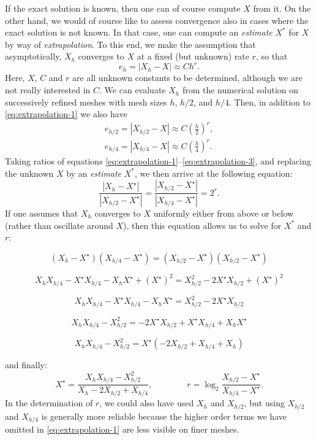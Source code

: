 If the exact solution is known, then one can of course compute $X$ from it.
On the other hand, we would of course like to assess convergence also in
cases where the exact solution is not known. In that case, one can compute
an \textit{estimate} $X^\ast$ for $X$ by way of \textit{extrapolation}.
To this end, we make the assumption that asymptotically, $X_h$ converges to
$X$ at a fixed (but unknown) rate $r$, so that
\begin{equation}
  \label{eq:extrapolation-1}
  e_h=|X_h-X| \approx C h^r.
\end{equation}
Here, $X$, $C$ and $r$ are all unknown constants to be determined, although
we are not really interested in $C$.
We can evaluate $X_h$ from the numerical solution
on successively refined meshes with mesh sizes $h$, $h/2$, and $h/4$. Then,
in addition to \eqref{eq:extrapolation-1} we also have
\begin{eqnarray}
  \label{eq:extrapolation-2}
  e_{h/2}=|X_{h/2}-X| \approx C \left(\frac h2\right)^r,
  \\
  \label{eq:extrapolation-3}
  e_{h/4} =|X_{h/4}-X| \approx C \left(\frac h4\right)^r.
\end{eqnarray}
Taking ratios of equations \eqref{eq:extrapolation-1}--\eqref{eq:extrapolation-3},
and replacing the unknown $X$ by an \textit{estimate} $X^\ast$, we then
arrive at the following equation:
\begin{equation*}
\frac{|X_h-X^\star|}{|X_{h/2}-X^\star|}
=
\frac{|X_{h/2}-X^\star|}{|X_{h/4}-X^\star|}=2^r.
\end{equation*}
If one assumes that $X_h$ converges to $X$ uniformly either from above or
below (rather than oscillate around $X$), then this equation allows us
to solve for $X^\ast$ and $r$:

\[
(X_h-X^\star)(X_{h/4}-X^\star)=(X_{h/2}-X^\star)(X_{h/2}-X^\star)
\]

\[
X_h X_{h/4}
-X^\star  X_{h/4}
- X_h X^\star 
+ (X^\star)^2
=X_{h/2}^2 -2 X^\star X_{h/2} + (X^\star)^2 
\]

\[
X_h X_{h/4}
-X^\star  X_{h/4}
- X_h X^\star 
=X_{h/2}^2 -2 X^\star X_{h/2} 
\]

\[
X_h X_{h/4}
-X_{h/2}^2 
=
-2 X^\star X_{h/2} 
+X^\star  X_{h/4}
+ X_h X^\star 
\]

\[
X_h X_{h/4}
-X_{h/2}^2 
=
X^\star ( -2  X_{h/2}  +   X_{h/4} + X_h )
\]

and finally:
\begin{equation*}
X^\star = \frac{X_h X_{h/4}-X_{h/2}^2}{X_h - 2 X_{h/2} + X_{h/4}}, \qquad\qquad
r = \log_2 \frac{X_{h/2}-X^\star}{X_{h/4}-X^\star}.
\end{equation*}
In the determination of $r$, we could also have used $X_h$ and $X_{h/2}$,
but using $X_{h/2}$ and $X_{h/4}$ is generally more reliable because
the higher order terms we have omitted in \eqref{eq:extrapolation-1} are less
visible on finer meshes.

